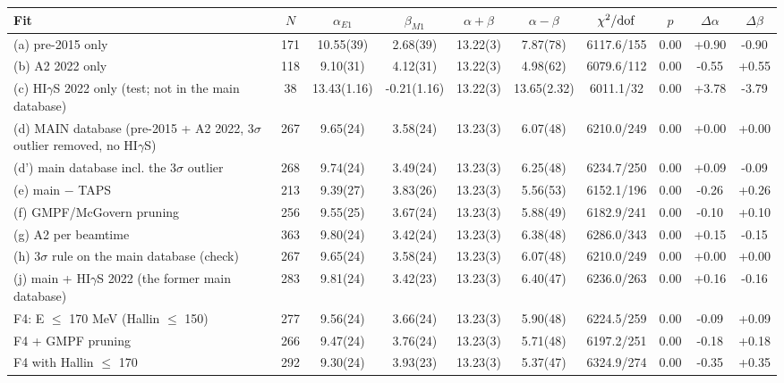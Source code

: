 \begin{tabular}{lccccccccc}
\hline
Fit & $N$ & $\alpha_{E1}$ & $\beta_{M1}$ & $\alpha+\beta$ & $\alpha-\beta$ & $\chi^2/{\rm dof}$ & $p$ & $\Delta\alpha$ & $\Delta\beta$ \\
\hline
(a) pre-2015 only & 171 & 10.55(39) & 2.68(39) & 13.22(3) & 7.87(78) & 6117.6/155 & 0.00 & +0.90 & -0.90 \\
(b) A2 2022 only & 118 & 9.10(31) & 4.12(31) & 13.22(3) & 4.98(62) & 6079.6/112 & 0.00 & -0.55 & +0.55 \\
(c) HI$\gamma$S 2022 only (test; not in the main database) & 38 & 13.43(1.16) & -0.21(1.16) & 13.22(3) & 13.65(2.32) & 6011.1/32 & 0.00 & +3.78 & -3.79 \\
(d) MAIN database (pre-2015 + A2 2022, 3$\sigma$ outlier removed, no HI$\gamma$S) & 267 & 9.65(24) & 3.58(24) & 13.23(3) & 6.07(48) & 6210.0/249 & 0.00 & +0.00 & +0.00 \\
(d') main database incl. the 3$\sigma$ outlier & 268 & 9.74(24) & 3.49(24) & 13.23(3) & 6.25(48) & 6234.7/250 & 0.00 & +0.09 & -0.09 \\
(e) main $-$ TAPS & 213 & 9.39(27) & 3.83(26) & 13.23(3) & 5.56(53) & 6152.1/196 & 0.00 & -0.26 & +0.26 \\
(f) GMPF/McGovern pruning & 256 & 9.55(25) & 3.67(24) & 13.23(3) & 5.88(49) & 6182.9/241 & 0.00 & -0.10 & +0.10 \\
(g) A2 per beamtime & 363 & 9.80(24) & 3.42(24) & 13.23(3) & 6.38(48) & 6286.0/343 & 0.00 & +0.15 & -0.15 \\
(h) 3$\sigma$ rule on the main database (check) & 267 & 9.65(24) & 3.58(24) & 13.23(3) & 6.07(48) & 6210.0/249 & 0.00 & +0.00 & +0.00 \\
(j) main + HI$\gamma$S 2022 (the former main database) & 283 & 9.81(24) & 3.42(23) & 13.23(3) & 6.40(47) & 6236.0/263 & 0.00 & +0.16 & -0.16 \\
F4: E $\le$ 170 MeV (Hallin $\le$ 150) & 277 & 9.56(24) & 3.66(24) & 13.23(3) & 5.90(48) & 6224.5/259 & 0.00 & -0.09 & +0.09 \\
F4 + GMPF pruning & 266 & 9.47(24) & 3.76(24) & 13.23(3) & 5.71(48) & 6197.2/251 & 0.00 & -0.18 & +0.18 \\
F4 with Hallin $\le$ 170 & 292 & 9.30(24) & 3.93(23) & 13.23(3) & 5.37(47) & 6324.9/274 & 0.00 & -0.35 & +0.35 \\
\hline
\end{tabular}

